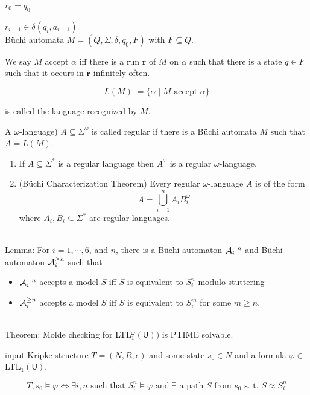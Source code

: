 \documentclass[12pt]{article}
\begin{document}
$r_0=q_0$

$r_{i+1}\in \delta(q_i,a_{i+1})$
\ \\


B\"{u}chi automata $M=(Q,\Sigma,\delta, q_0, F)$ with $F\subseteq Q$.

We say $M$ accept $\alpha$  iff there is a run $\mathbf{r}$ of $M$ on $\alpha$ such that there is a state $q\in F$ such that it occurs in $\mathbf{r}$ infinitely often. 

$$L(M):=\{\alpha\mid M \mbox{ accept } \alpha\}$$ 

is called the language recognized by $M$. 

A $\omega$-language) $A\subseteq \Sigma^{\omega}$ is called regular if there is a B\"{u}chi automata $M$ such that $A=L(M)$.  



\begin{enumerate}
\item If $A\subseteq\Sigma^*$ is a regular language then $A^{\omega}$ is a regular $\omega$-language.

\item (B\"{u}chi Characterization Theorem) Every regular $\omega$-language $A$ is of the form $$A=\bigcup_{i=1}^nA_iB_i^{\omega}$$
where $A_i, B_i\subseteq \Sigma^*$ are regular languages. 
\end{enumerate}
\ \\

Lemma: For $i=1,\cdots,6$, and $n$, there is a B\"{u}chi automaton ${\cal A}_i^{=n}$ and B\"{u}chi automaton ${\cal A}^{\geq n}_i$ such that
\begin{itemize}
\item ${\cal A}_i^{=n}$ accepts a model $S$ iff $S$ is equivalent to $S^n_i$ modulo stuttering
\item ${\cal A}^{\geq n}_i$ accepts a model $S$ iff $S$ is equivalent to $S^m_i$ for some $m\geq n$.
\end{itemize}
\ \\

Theorem: Molde checking for LTL$^\omega_1(\textsf{U}))$ is PTIME solvable.

input Kripke structure $T=(N,R,\epsilon)$ and some state $s_0\in N$ and a formula $\varphi\in $ LTL$_1(\textsf{U})$. 

$$T,s_0\models \varphi  \Longleftrightarrow \exists i,n \mbox{ such that }S_i^n\models \varphi \mbox{ and }\exists \mbox{ a path $S$ from $s_0$ s. t. }S\approx S^n_i$$ 
\end{document}
